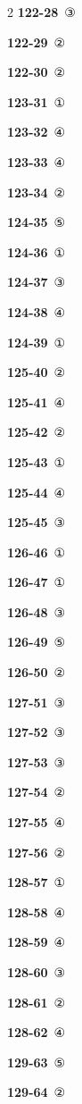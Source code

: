 \documentclass[10pt,a4paper]{article}
\begin{document}
\begin{multicols}{2}
\noindent\textbf{122-28}\ ③\par
\noindent\textbf{122-29}\ ②\par
\noindent\textbf{122-30}\ ②\par
\noindent\textbf{123-31}\ ①\par
\noindent\textbf{123-32}\ ④\par
\noindent\textbf{123-33}\ ④\par
\noindent\textbf{123-34}\ ②\par
\noindent\textbf{124-35}\ ⑤\par
\noindent\textbf{124-36}\ ①\par
\noindent\textbf{124-37}\ ③\par
\noindent\textbf{124-38}\ ④\par
\noindent\textbf{124-39}\ ①\par
\noindent\textbf{125-40}\ ②\par
\noindent\textbf{125-41}\ ④\par
\noindent\textbf{125-42}\ ②\par
\noindent\textbf{125-43}\ ①\par
\noindent\textbf{125-44}\ ④\par
\noindent\textbf{125-45}\ ③\par
\noindent\textbf{126-46}\ ①\par
\noindent\textbf{126-47}\ ①\par
\noindent\textbf{126-48}\ ③\par
\noindent\textbf{126-49}\ ⑤\par
\noindent\textbf{126-50}\ ②\par
\noindent\textbf{127-51}\ ③\par
\noindent\textbf{127-52}\ ③\par
\noindent\textbf{127-53}\ ③\par
\noindent\textbf{127-54}\ ②\par
\noindent\textbf{127-55}\ ④\par
\noindent\textbf{127-56}\ ②\par
\noindent\textbf{128-57}\ ①\par
\noindent\textbf{128-58}\ ④\par
\noindent\textbf{128-59}\ ④\par
\noindent\textbf{128-60}\ ③\par
\noindent\textbf{128-61}\ ②\par
\noindent\textbf{128-62}\ ④\par
\noindent\textbf{129-63}\ ⑤\par
\noindent\textbf{129-64}\ ②\par

\end{multicols}
\end{document}

